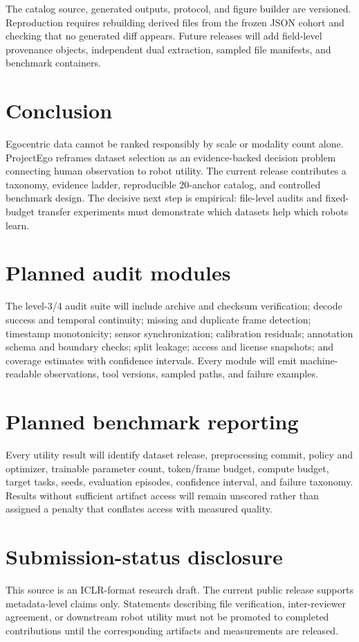 \documentclass{article}
\begin{document}
The catalog source, generated outputs, protocol, and figure builder are versioned. Reproduction requires rebuilding derived files from the frozen JSON cohort and checking that no generated diff appears. Future releases will add field-level provenance objects, independent dual extraction, sampled file manifests, and benchmark containers.

\section{Conclusion}

Egocentric data cannot be ranked responsibly by scale or modality count alone. ProjectEgo reframes dataset selection as an evidence-backed decision problem connecting human observation to robot utility. The current release contributes a taxonomy, evidence ladder, reproducible 20-anchor catalog, and controlled benchmark design. The decisive next step is empirical: file-level audits and fixed-budget transfer experiments must demonstrate which datasets help which robots learn.




\appendix
\section{Planned audit modules}

The level-3/4 audit suite will include archive and checksum verification; decode success and temporal continuity; missing and duplicate frame detection; timestamp monotonicity; sensor synchronization; calibration residuals; annotation schema and boundary checks; split leakage; access and license snapshots; and coverage estimates with confidence intervals. Every module will emit machine-readable observations, tool versions, sampled paths, and failure examples.

\section{Planned benchmark reporting}

Every utility result will identify dataset release, preprocessing commit, policy and optimizer, trainable parameter count, token/frame budget, compute budget, target tasks, seeds, evaluation episodes, confidence interval, and failure taxonomy. Results without sufficient artifact access will remain unscored rather than assigned a penalty that conflates access with measured quality.

\section{Submission-status disclosure}

This source is an ICLR-format research draft. The current public release supports metadata-level claims only. Statements describing file verification, inter-reviewer agreement, or downstream robot utility must not be promoted to completed contributions until the corresponding artifacts and measurements are released.
\end{document}
